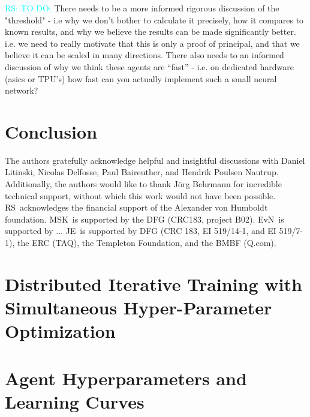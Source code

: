 \documentclass[twocolumn,preprintnumbers,amsmath,amssymb,notitlepage,nofootinbib,longbibliography,superscriptaddress,aps,pra,10pt]{revtex4-1}
\newcommand{\ryan}[1]{\textcolor{Cyan}{RS: #1}}
\begin{document}
	\ryan{TO DO:} There needs to be a more informed rigorous discussion of the "threshold" - i.e why we don't bother to calculate it precisely, how it compares to known results, and why we believe the results can be made significantly better.
	i.e. we need to really motivate that this is only a proof of principal, and that we believe it can be scaled in many directions.
	There also needs to an informed discussion of why we think these agents are ``fast'' - i.e. on dedicated hardware (asics or TPU's) how fast can you actually implement such a small neural network?

\section{Conclusion}\label{s:conclusions}

	\begin{acknowledgments}
		The authors gratefully acknowledge helpful and insightful discussions with Daniel Litinski, Nicolas Delfosse, Paul Baireuther, and Hendrik Poulsen Nautrup.
		Additionally, the authors would like to thank J\"{o}rg Behrmann for incredible technical support, without which this work would not have been possible.
		RS\ acknowledges the financial support of the Alexander von Humboldt foundation.
		MSK\ is supported by the DFG (CRC183, project B02).
		EvN\ is supported by ...
		JE\ is supported by DFG (CRC 183, EI 519/14-1, and EI 519/7-1), the ERC (TAQ), the Templeton Foundation, and the BMBF (Q.com).
	\end{acknowledgments}

\appendix

\section{Distributed Iterative Training with Simultaneous Hyper-Parameter Optimization}\label{A:training}

\section{Agent Hyperparameters and Learning Curves}\label{A:parameters}


\end{document}
